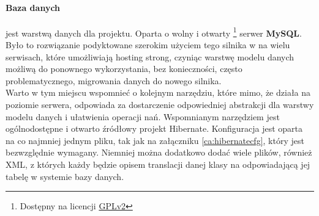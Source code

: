 		\paragraph{Baza danych} jest warstwą danych dla projektu. Oparta o wolny i otwarty \footnote{
			Dostępny na licencji \href{http://www.gnu.org/licenses/old-licenses/gpl-2.0.html}{GPLv2}
		}
			serwer \textbf{MySQL}. Było to rozwiązanie podyktowane szerokim użyciem tego silnika w 
			na wielu serwisach, które umożliwiają hosting strong, czyniąc warstwę modelu danych możliwą
			do ponownego wykorzystania, bez konieczności, często problematycznego, migrowania danych do
			nowego silnika. \\
			Warto w tym miejscu wspomnieć o kolejnym narzędziu, które mimo, że działa na poziomie serwera, 
			odpowiada za dostarczenie odpowiedniej abstrakcji dla warstwy modelu danych i ułatwienia
			operacji nań. Wspomnianym narzędziem jest ogólnodostępne i otwarto źródłowy projekt Hibernate. 
			Konfiguracja jest oparta na co najmniej jednym pliku, tak jak na załączniku \ref{ca:hibernatecfg},
			który jest bezwzględnie wymagany. Niemniej można dodatkowo dodać wiele plików, również XML, z których
			każdy będzie opisem translacji danej klasy na odpowiadającą jej tabelę w systemie bazy danych. 
